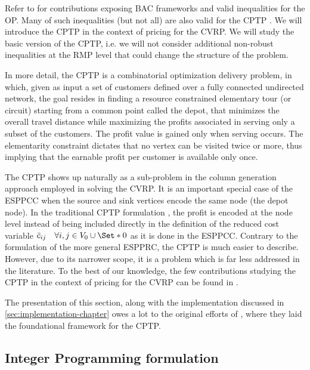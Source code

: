 Refer to \textcite{fischetti1998, gendreau1998} for contributions
exposing BAC frameworks and valid inequalities for the OP.
Many of such inequalities (but not all) are also valid for the CPTP \parencite{jepsen2014}.
We will introduce the CPTP in the context of pricing for the CVRP.
We will study the basic version of the CPTP,
i.e. we will not consider additional non-robust inequalities
at the RMP level that could change the structure of the problem.

\medskip

In more detail,
the CPTP is a combinatorial optimization delivery problem,
in which,
given as input a set of customers
defined over a fully connected undirected network, the goal resides in finding
a resource constrained elementary tour (or circuit) starting from a common point called the depot,
that minimizes the overall travel distance while maximizing
the profits associated in serving only a subset of the customers.
The profit value is gained only when serving occurs.
The elementarity constraint dictates that no vertex
can be visited twice or more, thus implying that the earnable profit
per customer is available only once.

The CPTP shows up naturally as a sub-problem
in the column generation approach employed in solving the CVRP.
It is an important special case of the
ESPPCC when the source and sink vertices encode the same node (the depot node).
In the traditional CPTP formulation \parencite{jepsen2014},
the profit is encoded at the node level
instead of being included directly in the definition
of the reduced cost variable $\bar{c}_{ij} \quad \forall i, j \in V_0 \cup \Set*{0}$
as it is done in the ESPPCC.
Contrary to the formulation of the more general ESPPRC,
the CPTP is much easier to describe.
However, due to its narrower scope,
it is a problem which is far less addressed in the literature.
To the best of our knowledge, the few contributions studying the CPTP
in the context of pricing for the CVRP can be found in \textcite{bixby1999, jepsen2011,jepsen2014}.

The presentation of this section,
along with the implementation discussed in \cref{sec:implementation-chapter}
owes a lot to the original efforts of \textcite{jepsen2014},
where they laid the foundational framework for the CPTP.

\subsection{Integer Programming formulation}
\label{sec:cptp-integer-programming-formulation}

